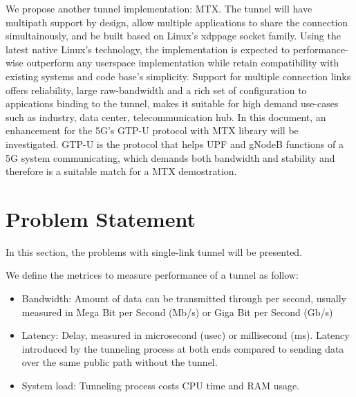 We propose another tunnel implementation: \ac{MTX}. 
The tunnel will have multipath support by design, allow multiple applications to share the connection simultainously, and be built based on Linux's \ac{xdppage} socket family.
Using the latest native Linux's technology, the implementation is expected to performance-wise outperform any userspace implementation while retain compatibility with existing systems and code base's simplicity. 
Support for multiple connection links offers reliability, large raw-bandwidth and a rich set of configuration to appications binding to the tunnel, makes it suitable for high demand use-cases such as industry, data center, telecommunication hub. 
In this document, an enhancement for the 5G's GTP-U protocol with \ac{MTX} library will be investigated. GTP-U is the protocol that helps UPF and gNodeB functions of a 5G system communicating, which demands both bandwidth and stability and therefore is a suitable match for a \ac{MTX} demostration.


\section{Problem Statement}
In this section, the problems with single-link tunnel will be presented.

We define the metrices to measure performance of a tunnel as follow:

\begin{itemize}
\item Bandwidth: Amount of data can be transmitted through per second, usually measured in Mega Bit per Second (Mb/s) or Giga Bit per Second (Gb/s)
\item Latency: Delay, measured in microsecond (usec) or millisecond (ms). Latency introduced by the tunneling process at both ends compared to sending data over the same public path without the tunnel.
\item System load: Tunneling process costs CPU time and RAM usage.
\end{itemize}

